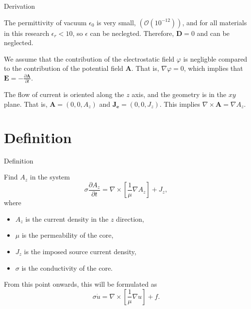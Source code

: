 \documentclass[aspectratio=43]{beamer}
\begin{document}
\begin{frame}{Derivation}

\begin{assumption}
    The permittivity of vacuum $\epsilon_0$ is very small, $(\mathcal{O}(10^{-12}))$, and for all materials in this research $\epsilon_r < 10$, so $\epsilon$ can be neclegted. Therefore, $\mathbf{D} = 0$ and can be neglected.
\end{assumption}

\begin{assumption}
    We assume that the contribution of the electrostatic field $\varphi$ is negligble compared to the contribution of the potential field $\mathbf A$. That is, $\nabla \varphi = 0$, which implies that $\mathbf{E} = -\frac{\partial \mathbf{A}}{\partial t}$.
\end{assumption}

\begin{assumption}
    The flow of current is oriented along the $z$ axis, and the geometry is in the $xy$ plane. That is, $\mathbf{A} = (0, 0, A_z)$ and $\mathbf{J_e} = (0, 0, J_z)$. This implies $\nabla \times \mathbf A = \nabla A_z$.
\end{assumption}
\end{frame}



\section{Definition}
\begin{frame}[fragile]{Definition} %
    \begin{problemdef}
        Find $A_z$ in the system
        \begin{equation}
            \sigma\frac{\partial A_z}{\partial t} = \nabla \times \left[\frac{1}{\mu}\nabla A_z\right] + J_z,
        \end{equation}
        where
        \begin{itemize}
            \item $A_z$ is the current density in the $z$ direction,
            \item $\mu$ is the permeability of the core,
            \item $J_z$ is the imposed source current density,
            \item $\sigma$ is the conductivity of the core.
        \end{itemize}
        From this point onwards, this will be formulated as
        \begin{equation}
            \sigma\dot u = \nabla \times \left[\frac{1}{\mu}\nabla u\right] + f.
        \end{equation}
    \end{problemdef}
\end{frame}
\end{document}

